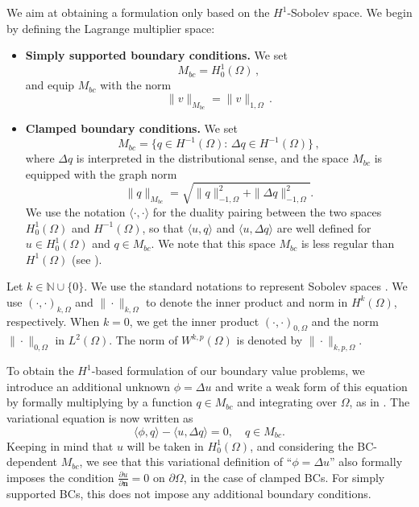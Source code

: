 \documentclass[a4paper,final]{siamltex}
\newcommand{\M}{{M_{bc}}}
\newcommand{\BBN}{\mbox{$\mathbb{N}$}}
\begin{document}
We aim at obtaining a formulation only based on the $H^1$-Sobolev space.
We begin by defining the Lagrange multiplier space:
\\
\begin{itemize}
	\item {\bf Simply supported boundary conditions.} We set
		\[
			\M = H_0^1(\Omega)\,,
		\]
		and equip $\M$ with the norm
		\[
			\|v\|_{\M} = \|v\|_{1,\Omega}\,.
		\]
	\item {\bf Clamped boundary conditions.} We set
		\[
			\M = \{ q \in H^{-1}(\Omega):\, \Delta q \in H^{-1}(\Omega)\}\,,
		\]
		where $\Delta q$ is interpreted in the distributional sense, and the space $\M$ is 
		equipped with the graph norm
		\[
			\|q\|_{\M} = \sqrt{\|q\|_{-1,\Omega}^2 + \|\Delta q\|_{-1,\Omega}^2}.
		\]
		We use the notation  $\langle \cdot,\cdot \rangle$ for the duality pairing 
		between the two spaces $H^1_0(\Omega)$ and $H^{-1}(\Omega)$, so that 
		$\langle u,q\rangle$ and $\langle u,\Delta q\rangle$ are well defined for
		$ u \in H^1_0(\Omega)$ and $q\in  \M$. We note that 
		this space $\M$ is less regular than $H^1(\Omega)$ (see \cite{BGM92,Zul15}).
\end{itemize}
%
%
\medskip

Let $ k \in \BBN\cup \{0\}$. 
We use the standard notations to represent Sobolev spaces \cite{Ada75,BS92}. 
We use $(\cdot,\cdot)_{k,\Omega}$ and $\|\cdot\|_{k,\Omega}$ to denote the 
inner product and norm in $H^k(\Omega)$, respectively. 
When $k=0$, we get the inner product $(\cdot,\cdot)_{0,\Omega}$ and the norm 
$\|\cdot\|_{0,\Omega}$ in $L^2(\Omega)$. The norm of
$W^{k,p}(\Omega)$ is denoted by $\|\cdot\|_{k,p,\Omega}$. 


To obtain the $H^1$-based formulation of our boundary value problems, we
introduce an additional unknown $\phi = \Delta u$ and write a weak form of this
equation by formally multiplying by a function $ q \in \M$  and 
integrating over $\Omega$, as in \cite{BGM92,Zul15}.  The variational equation
is now written as 
\[
\langle \phi,q\rangle - \langle u, \Delta q \rangle =0,\quad q \in \M.
\]
Keeping in mind that $u$ will be taken in $H^1_0(\Omega)$, and considering the
BC-dependent $\M$, we see that this variational definition of ``$\phi=\Delta
u$'' also formally imposes the condition $\frac{\partial u}{\partial
\boldsymbol{n}}=0$ on $\partial\Omega$, in the case of clamped BCs. For simply
supported BCs, this does not impose any additional boundary conditions.
\end{document}
